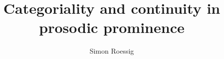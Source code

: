 \author{Simon Roessig}
\title{Categoriality and continuity in prosodic prominence}
\subtitle{}
\renewcommand{\lsSeries}{silp}
\renewcommand{\lsSeriesNumber}{}
\renewcommand{\lsID}{281}
